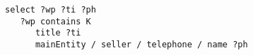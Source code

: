 
{\footnotesize
\begin{verbatim}
select ?wp ?ti ?ph
   ?wp contains K
      title ?ti
      mainEntity / seller / telephone / name ?ph
\end{verbatim}
}